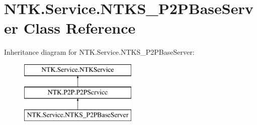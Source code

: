 \hypertarget{class_n_t_k_1_1_service_1_1_n_t_k_s___p2_p_base_server}{}\section{N\+T\+K.\+Service.\+N\+T\+K\+S\+\_\+\+P2\+P\+Base\+Server Class Reference}
\label{class_n_t_k_1_1_service_1_1_n_t_k_s___p2_p_base_server}
Inheritance diagram for N\+T\+K.\+Service.\+N\+T\+K\+S\+\_\+\+P2\+P\+Base\+Server\+:\begin{figure}[H]
\begin{center}
\leavevmode
\includegraphics[height=3.000000cm]{d0/de0/class_n_t_k_1_1_service_1_1_n_t_k_s___p2_p_base_server}
\end{center}
\end{figure}

